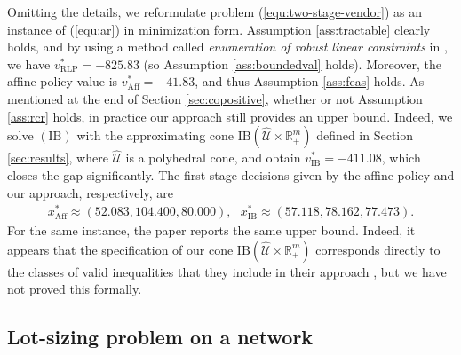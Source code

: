 \documentclass[12pt]{article}
\DeclareMathOperator{\AR}{RLP}
\DeclareMathOperator{\AP}{Aff}
\newcommand{\K}{\widehat{\mathcal{U}}}
\newcommand{\IB}{\mathrm{IB}}
\def\RR{{\mathbb{R}}}
\newcommand{\Q}{{\K \times \RR^m_+}}
\begin{document}
\begin{onehalfspace}
Omitting the details, we reformulate problem
(\ref{equ:two-stage-vendor}) as an instance of (\ref{equ:ar}) in
minimization form. Assumption \ref{ass:tractable} clearly holds, and by
using a method called {\em enumeration of robust linear constraints}
in \cite{Gorissen.Hertog.2013}, we have $v_{\AR}^* = -825.83$ (so
Assumption \ref{ass:boundedval} holds). Moreover, the affine-policy
value is $v_{\AP}^*=-41.83$, and thus Assumption \ref{ass:feas} holds.
As mentioned at the end of Section \ref{sec:copositive}, whether or
not Assumption \ref{ass:rcr} holds, in practice our approach still
provides an upper bound. Indeed, we solve $(\IB)$ with the approximating
cone $\IB(\Q)$ defined in Section \ref{sec:results}, where $\K$ is a
polyhedral cone, and obtain $v_{\IB}^* = -411.08$, which closes the gap
significantly. The first-stage decisions given by the affine policy and
our approach, respectively, are
%
\[
\begin{array}{c}
x_{\AP}^* \approx (52.083, 104.400, 80.000), \ \ \ x_{\IB}^* \approx (57.118, 78.162, 77.473).
\end{array}
\]
For the same instance, the paper \cite{Ardestani-Jaafari.Delage.2016}
reports the same upper bound. Indeed, it appears that the
specification of our cone $\IB(\Q)$ corresponds directly to the
classes of valid inequalities that they include in their approach
\cite{Ardestani-Jaafari.Delage.2017}, but we have not proved this
formally.


\subsection{Lot-sizing problem on a network} \label{ssec:network}


\end{onehalfspace}
\end{document}
